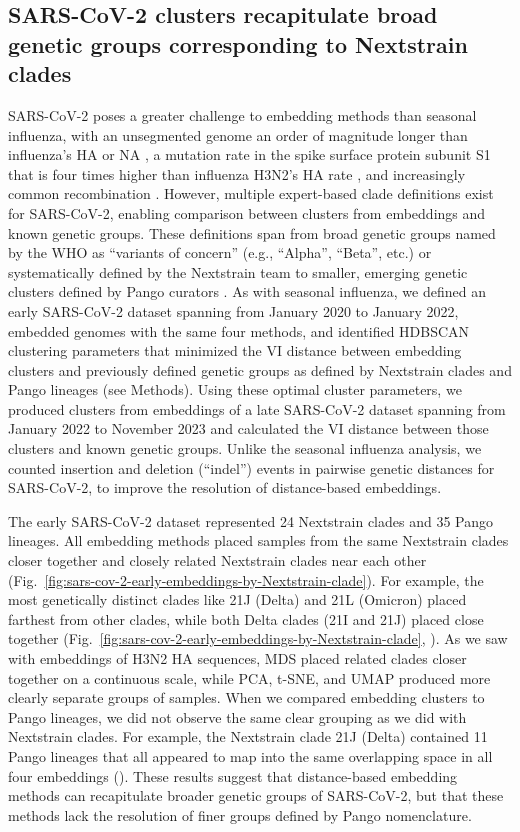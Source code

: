 \documentclass[10pt,letterpaper]{article}
\begin{document}
\subsection*{SARS-CoV-2 clusters recapitulate broad genetic groups corresponding to Nextstrain clades}

SARS-CoV-2 poses a greater challenge to embedding methods than seasonal influenza, with an unsegmented genome an order of magnitude longer than influenza's HA or NA \cite{Zhu2020}, a mutation rate in the spike surface protein subunit S1 that is four times higher than influenza H3N2's HA rate \cite{Kistler2022}, and increasingly common recombination \cite{Focosi2022,Turakhia2022}.
However, multiple expert-based clade definitions exist for SARS-CoV-2, enabling comparison between clusters from embeddings and known genetic groups.
These definitions span from broad genetic groups named by the WHO as ``variants of concern'' (e.g., ``Alpha'', ``Beta'', etc.) \cite{Konings2021} or systematically defined by the Nextstrain team \cite{Hodcroft2020,Bedford2021,Roemer2022} to smaller, emerging genetic clusters defined by Pango curators \cite{OToole2021}.
As with seasonal influenza, we defined an early SARS-CoV-2 dataset spanning from January 2020 to January 2022, embedded genomes with the same four methods, and identified HDBSCAN clustering parameters that minimized the VI distance between embedding clusters and previously defined genetic groups as defined by Nextstrain clades and Pango lineages (see Methods).
Using these optimal cluster parameters, we produced clusters from embeddings of a late SARS-CoV-2 dataset spanning from January 2022 to November 2023 and calculated the VI distance between those clusters and known genetic groups.
Unlike the seasonal influenza analysis, we counted insertion and deletion (``indel'') events in pairwise genetic distances for SARS-CoV-2, to improve the resolution of distance-based embeddings.

The early SARS-CoV-2 dataset represented 24 Nextstrain clades and 35 Pango lineages.
All embedding methods placed samples from the same Nextstrain clades closer together and closely related Nextstrain clades near each other (Fig.~\ref{fig:sars-cov-2-early-embeddings-by-Nextstrain-clade}).
For example, the most genetically distinct clades like 21J (Delta) and 21L (Omicron) placed farthest from other clades, while both Delta clades (21I and 21J) placed close together (Fig.~\ref{fig:sars-cov-2-early-embeddings-by-Nextstrain-clade}, ).
As we saw with embeddings of H3N2 HA sequences, MDS placed related clades closer together on a continuous scale, while PCA, t-SNE, and UMAP produced more clearly separate groups of samples.
When we compared embedding clusters to Pango lineages, we did not observe the same clear grouping as we did with Nextstrain clades.
For example, the Nextstrain clade 21J (Delta) contained 11 Pango lineages that all appeared to map into the same overlapping space in all four embeddings ().
These results suggest that distance-based embedding methods can recapitulate broader genetic groups of SARS-CoV-2, but that these methods lack the resolution of finer groups defined by Pango nomenclature.
\end{document}
